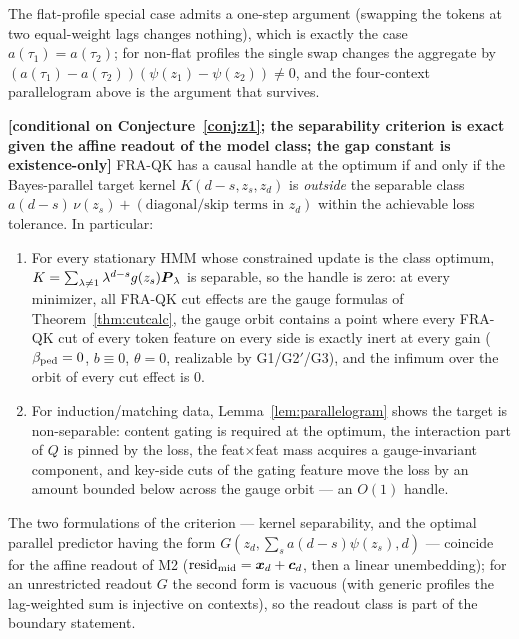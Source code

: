 \documentclass{article}
\begin{document}
\begin{remark}
The flat-profile special case admits a one-step argument (swapping the tokens at two equal-weight lags changes nothing), which is exactly the case $a(\tau_1) = a(\tau_2)$; for non-flat profiles the single swap changes the aggregate by $(a(\tau_1) - a(\tau_2))(\psi(z_1) - \psi(z_2)) \ne 0$, and the four-context parallelogram above is the argument that survives.
\end{remark}

\begin{theorem}\label{thm:boundary}
\textbf{[conditional on Conjecture~\ref{conj:z1}; the separability criterion is exact given the affine readout of the model class; the gap constant is existence-only]} FRA-QK has a causal handle at the optimum if and only if the Bayes-parallel target kernel $K(d-s, z_s, z_d)$ is \emph{outside} the separable class $a(d-s)\,\nu(z_s) + (\text{diagonal/skip terms in } z_d)$ within the achievable loss tolerance. In particular:
\begin{enumerate}
    \item For every stationary HMM whose constrained update is the class optimum, $K = \sum_{\lambda\ne1}\lambda^{d-s} g(z_s)\boldsymbol{P}_\lambda$ is separable, so the handle is zero: at every minimizer, all FRA-QK cut effects are the gauge formulas of Theorem~\ref{thm:cutcalc}, the gauge orbit contains a point where every FRA-QK cut of every token feature on every side is exactly inert at every gain ($\beta_{\mathrm{ped}} = 0$, $b \equiv 0$, $\theta = 0$, realizable by G1/G2$'$/G3), and the infimum over the orbit of every cut effect is $0$.
    \item For induction/matching data, Lemma~\ref{lem:parallelogram} shows the target is non-separable: content gating is required at the optimum, the interaction part of $Q$ is pinned by the loss, the feat$\times$feat mass acquires a gauge-invariant component, and key-side cuts of the gating feature move the loss by an amount bounded below across the gauge orbit --- an $O(1)$ handle.
\end{enumerate}
The two formulations of the criterion --- kernel separability, and the optimal parallel predictor having the form $G(z_d, \sum_s a(d-s)\psi(z_s), d)$ --- coincide for the affine readout of M2 ($\mathrm{resid}_{\mathrm{mid}} = \boldsymbol{x}_d + \boldsymbol{c}_d$, then a linear unembedding); for an unrestricted readout $G$ the second form is vacuous (with generic profiles the lag-weighted sum is injective on contexts), so the readout class is part of the boundary statement.
\end{theorem}
\end{document}
